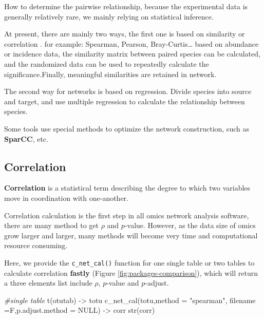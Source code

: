 \documentclass[
]{book}
\newenvironment{Shaded}{\begin{snugshade}}{\end{snugshade}}
\newcommand{\AttributeTok}[1]{\textcolor[rgb]{0.77,0.63,0.00}{#1}}
\newcommand{\CommentTok}[1]{\textcolor[rgb]{0.56,0.35,0.01}{\textit{#1}}}
\newcommand{\ConstantTok}[1]{\textcolor[rgb]{0.00,0.00,0.00}{#1}}
\newcommand{\FunctionTok}[1]{\textcolor[rgb]{0.00,0.00,0.00}{#1}}
\newcommand{\NormalTok}[1]{#1}
\newcommand{\OtherTok}[1]{\textcolor[rgb]{0.56,0.35,0.01}{#1}}
\newcommand{\StringTok}[1]{\textcolor[rgb]{0.31,0.60,0.02}{#1}}
\begin{document}
How to determine the pairwise relationship, because the experimental data is generally relatively rare, we mainly relying on statistical inference.

At present, there are mainly two ways, the first one is based on similarity or correlation \citet{faustMicrobialInteractionsNetworks2012}. for example: Spearman, Pearson, Bray-Curtis\ldots{} based on abundance or incidence data, the similarity matrix between paired species can be calculated, and the randomized data can be used to repeatedly calculate the significance.Finally, meaningful similarities are retained in network.

The second way for networks is based on regression. Divide species into source and target, and use multiple regression to calculate the relationship between species.

Some tools use special methods to optimize the network construction, such as \textbf{SparCC}, etc.

\hypertarget{correlation}{%
\subsection{Correlation}\label{correlation}}

\textbf{Correlation} is a statistical term describing the degree to which two variables move in coordination with one-another.

Correlation calculation is the first step in all omics network analysis software, there are many method to get \(\rho\) and \(p\)-value. However, as the data size of omics grow larger and larger, many methods will become very time and computational resource consuming.

Here, we provide the \texttt{c\_net\_cal()} function for one single table or two tables to calculate correlation \textbf{fastly} (Figure \ref{fig:packages-comparison}), which will return a three elements list include \(\rho\), \(p\)-value and \(p\)-adjust.

\begin{Shaded}
\begin{Highlighting}[]
\CommentTok{\#single table}
\FunctionTok{t}\NormalTok{(otutab) }\OtherTok{{-}\textgreater{}}\NormalTok{ totu}
\FunctionTok{c\_net\_cal}\NormalTok{(totu,}\AttributeTok{method =} \StringTok{"spearman"}\NormalTok{, }\AttributeTok{filename =}\NormalTok{F,}\AttributeTok{p.adjust.method =} \ConstantTok{NULL}\NormalTok{) }\OtherTok{{-}\textgreater{}}\NormalTok{ corr}
\FunctionTok{str}\NormalTok{(corr)}
\end{Highlighting}
\end{Shaded}
\end{document}

